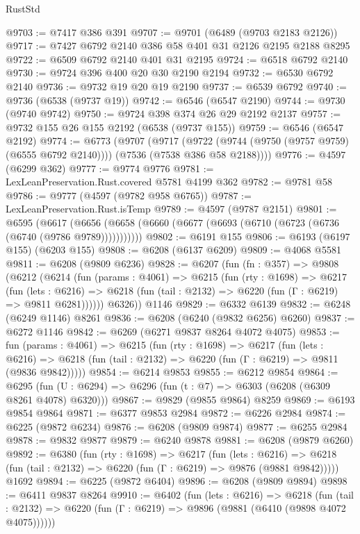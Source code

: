 \begin{lexlean}{RustStd}
\begin{coremodule}
@9703 := @7417 @386 @391
@9707 := @9701 (@6489 (@9703 @2183 @2126))
@9717 := @7427 @6792 @2140 @386 @58 @401 @31 @2126 @2195 @2188 @8295
@9722 := @6509 @6792 @2140 @401 @31 @2195
@9724 := @6518 @6792 @2140
@9730 := @9724 @396 @400 @20 @30 @2190 @2194
@9732 := @6530 @6792 @2140
@9736 := @9732 @19 @20 @19 @2190
@9737 := @6539 @6792
@9740 := @9736 (@6538 (@9737 @19))
@9742 := @6546 (@6547 @2190)
@9744 := @9730 (@9740 @9742)
@9750 := @9724 @398 @374 @26 @29 @2192 @2137
@9757 := @9732 @155 @26 @155 @2192 (@6538 (@9737 @155))
@9759 := @6546 (@6547 @2192)
@9774 := @6773
    (@9707
      (@9717
        (@9722 (@9744 (@9750 (@9757 @9759) (@6555 @6792 @2140))))
        (@7536 (@7538 @386 @58 @2188))))
@9776 := @4597 (@6299 @362)
@9777 := @9774 @9776
@9781 := LexLeanPreservation.Rust.covered @5781 @4199 @362
@9782 := @9781 @58
@9786 := @9777 (@4597 (@9782 @958 @6765))
@9787 := LexLeanPreservation.Rust.isTemp
@9789 := @4597 (@9787 @2151)
@9801 := @6595
    (@6617 (@6656 (@6658 (@6660 (@6677 (@6693 (@6710 (@6723 (@6736 (@6740 (@9786 @9789)))))))))))
@9802 := @6191 @155
@9806 := @6193 (@6197 @155) (@6203 @155)
@9808 := @6208 (@6137 @6209)
@9809 := @4068 @5581
@9811 := @6208 (@9809 @6236)
@9828 := @6207
    (fun (fn : @357) =>
    @9808
      (@6212
        (@6214
          (fun (params : @4061) =>
          @6215
            (fun (rty : @1698) =>
            @6217
              (fun (lets : @6216) =>
              @6218 (fun (tail : @2132) => @6220 (fun (Γ : @6219) => @9811 @6281))))))
        @6326))
    @1146
@9829 := @6332 @6139
@9832 := @6248 (@6249 @1146) @8261
@9836 := @6208 (@6240 (@9832 @6256) @6260)
@9837 := @6272 @1146
@9842 := @6269 (@6271 @9837 @8264 @4072 @4075)
@9853 := fun (params : @4061) =>
  @6215
    (fun (rty : @1698) =>
    @6217
      (fun (lets : @6216) =>
      @6218 (fun (tail : @2132) => @6220 (fun (Γ : @6219) => @9811 (@9836 @9842)))))
@9854 := @6214 @9853
@9855 := @6212 @9854
@9864 := @6295 (fun (U : @6294) => @6296 (fun (t : @7) => @6303 (@6208 (@6309 @8261 @4078) @6320)))
@9867 := @9829 (@9855 @9864) @8259
@9869 := @6193 @9854 @9864
@9871 := @6377 @9853 @2984
@9872 := @6226 @2984
@9874 := @6225 (@9872 @6234)
@9876 := @6208 (@9809 @9874)
@9877 := @6255 @2984
@9878 := @9832 @9877
@9879 := @6240 @9878
@9881 := @6208 (@9879 @6260)
@9892 := @6380
    (fun (rty : @1698) =>
    @6217
      (fun (lets : @6216) =>
      @6218 (fun (tail : @2132) => @6220 (fun (Γ : @6219) => @9876 (@9881 @9842)))))
    @1692
@9894 := @6225 (@9872 @6404)
@9896 := @6208 (@9809 @9894)
@9898 := @6411 @9837 @8264
@9910 := @6402
    (fun (lets : @6216) =>
    @6218
      (fun (tail : @2132) => @6220 (fun (Γ : @6219) => @9896 (@9881 (@6410 (@9898 @4072 @4075))))))

\end{coremodule}
\end{lexlean}
